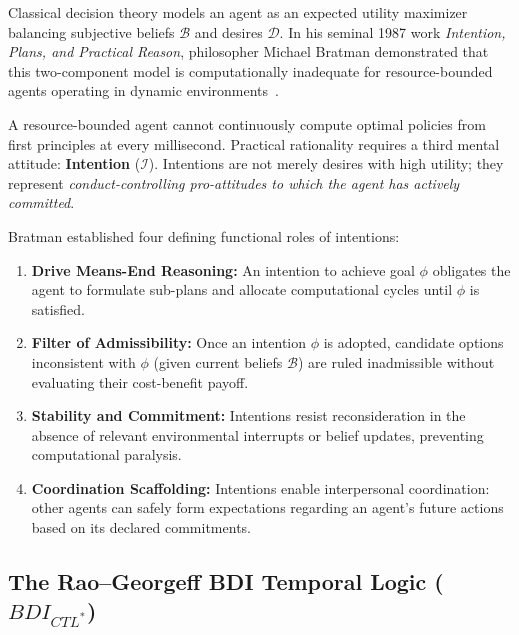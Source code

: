 \documentclass[11pt,a4paper]{article}
\providecommand{\pdmarginanalogy}[4]{}
\begin{document}
Classical decision theory models an agent as an expected utility maximizer balancing subjective beliefs $\mathcal{B}$ and desires $\mathcal{D}$. In his seminal 1987 work \emph{Intention, Plans, and Practical Reason}, philosopher Michael Bratman demonstrated that this two-component model is computationally inadequate for resource-bounded agents operating in dynamic environments~.

A resource-bounded agent cannot continuously compute optimal policies from first principles at every millisecond. Practical rationality requires a third mental attitude: \textbf{Intention} ($\mathcal{I}$). Intentions are not merely desires with high utility; they represent \emph{conduct-controlling pro-attitudes to which the agent has actively committed}.

\pdmarginanalogy{prereq-flywheel-governor}{}{ch01-flywheel-governor}{Like a centrifugal flywheel governor throttling steam to stabilize rotational speed, practical rationality stabilizes an agent's intentions against transient sensor noise.}%
Bratman established four defining functional roles of intentions:
\begin{enumerate}[leftmargin=1.8em,itemsep=2pt]
  \item \textbf{Drive Means-End Reasoning:} An intention to achieve goal $\phi$ obligates the agent to formulate sub-plans and allocate computational cycles until $\phi$ is satisfied.
  \item \textbf{Filter of Admissibility:} Once an intention $\phi$ is adopted, candidate options inconsistent with $\phi$ (given current beliefs $\mathcal{B}$) are ruled inadmissible without evaluating their cost-benefit payoff.
  \item \textbf{Stability and Commitment:} Intentions resist reconsideration in the absence of relevant environmental interrupts or belief updates, preventing computational paralysis.
  \item \textbf{Coordination Scaffolding:} Intentions enable interpersonal coordination: other agents can safely form expectations regarding an agent's future actions based on its declared commitments.
\end{enumerate}

\subsection{The Rao--Georgeff BDI Temporal Logic (\texorpdfstring{$BDI_{CTL^*}$}{BDI-CTL*})}
\end{document}

